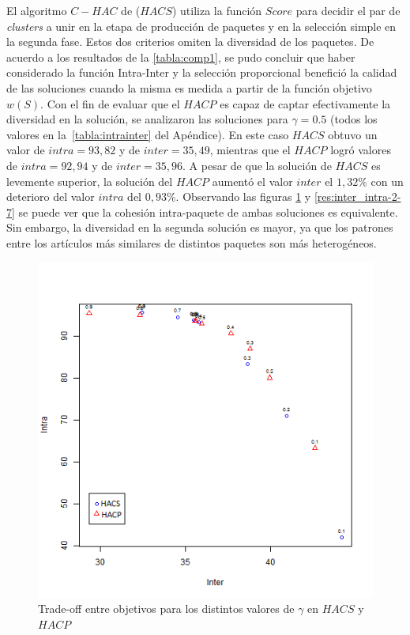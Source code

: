 El algoritmo $C-HAC$ de \cite{journals/tkde/Amer-YahiaBCFMZ14} ($HACS$) utiliza la función $Score$ para decidir el par de {\em clusters} a unir en la etapa de producción de paquetes y en la selección simple en la segunda fase. Estos dos criterios omiten la diversidad de los paquetes. De acuerdo a los resultados de la \autoref{tabla:comp1}, se pudo concluir que haber considerado la función Intra-Inter y la selección proporcional benefició la calidad de las soluciones cuando la misma es medida a partir de la función objetivo $w(S)$. Con el fin de evaluar que el $HACP$ es capaz de captar efectivamente la diversidad en la solución, se analizaron las soluciones para $\gamma=0.5$ (todos los valores en la~\autoref{tabla:intrainter} del Apéndice). En este caso $HACS$ obtuvo un valor de $intra=93,82$ y de $inter=35,49$, mientras que el $HACP$ logró valores de $intra=92,94$ y de $inter=35,96$. A pesar de que la solución de $HACS$ es levemente superior, la solución del $HACP$ aumentó el valor $inter$ el $1,32\%$ con un deterioro del valor $intra$ del $0,93\%$. Observando las figuras \ref{res:inter_intra-1-5} y \ref{res:inter_intra-2-7} se puede ver que la cohesión intra-paquete de ambas soluciones es equivalente. Sin embargo, la diversidad en la segunda solución es mayor, ya que los patrones entre los artículos más similares de distintos paquetes son más heterogéneos. 

\begin{figure}[H]
	\centering
	\includegraphics[width=0.60\linewidth]{img/alg1_vs_alg5.png}
	\caption{Trade-off entre objetivos para los distintos valores de $\gamma$ en $HACS$ y $HACP$}
	\label{res:inter_intra-1-5}
\end{figure}

